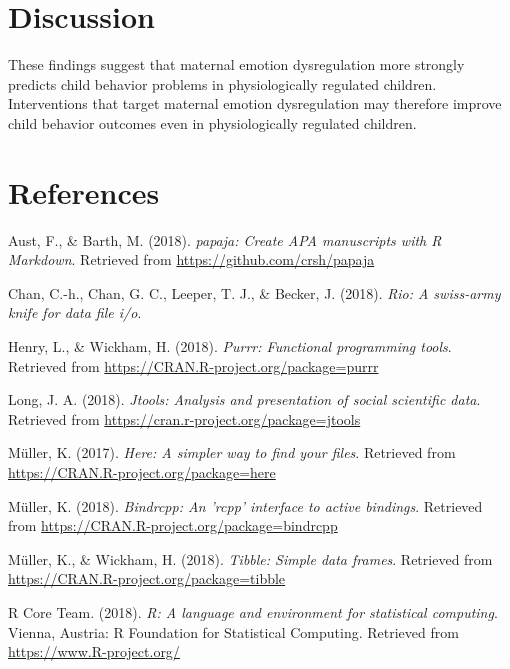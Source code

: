 \documentclass[man]{apa6}
\begin{document}
\section{Discussion}\label{discussion}

These findings suggest that maternal emotion dysregulation more strongly
predicts child behavior problems in physiologically regulated children.
Interventions that target maternal emotion dysregulation may therefore
improve child behavior outcomes even in physiologically regulated
children.

\newpage

\section{References}\label{references}

\begingroup
\setlength{\parindent}{-0.5in} \setlength{\leftskip}{0.5in}

\hypertarget{refs}{}
\hypertarget{ref-R-papaja}{}
Aust, F., \& Barth, M. (2018). \emph{papaja: Create APA manuscripts with
R Markdown}. Retrieved from \url{https://github.com/crsh/papaja}

\hypertarget{ref-R-rio}{}
Chan, C.-h., Chan, G. C., Leeper, T. J., \& Becker, J. (2018).
\emph{Rio: A swiss-army knife for data file i/o}.

\hypertarget{ref-R-purrr}{}
Henry, L., \& Wickham, H. (2018). \emph{Purrr: Functional programming
tools}. Retrieved from \url{https://CRAN.R-project.org/package=purrr}

\hypertarget{ref-R-jtools}{}
Long, J. A. (2018). \emph{Jtools: Analysis and presentation of social
scientific data}. Retrieved from
\url{https://cran.r-project.org/package=jtools}

\hypertarget{ref-R-here}{}
Müller, K. (2017). \emph{Here: A simpler way to find your files}.
Retrieved from \url{https://CRAN.R-project.org/package=here}

\hypertarget{ref-R-bindrcpp}{}
Müller, K. (2018). \emph{Bindrcpp: An 'rcpp' interface to active
bindings}. Retrieved from
\url{https://CRAN.R-project.org/package=bindrcpp}

\hypertarget{ref-R-tibble}{}
Müller, K., \& Wickham, H. (2018). \emph{Tibble: Simple data frames}.
Retrieved from \url{https://CRAN.R-project.org/package=tibble}

\hypertarget{ref-R-base}{}
R Core Team. (2018). \emph{R: A language and environment for statistical
computing}. Vienna, Austria: R Foundation for Statistical Computing.
Retrieved from \url{https://www.R-project.org/}
\end{document}
